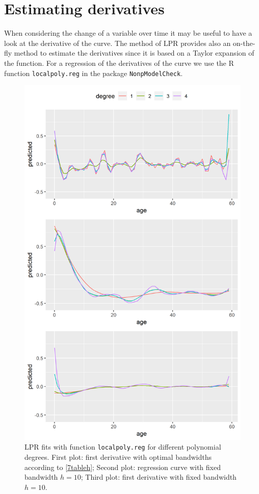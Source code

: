 \section{Estimating derivatives}
When considering the change of a variable over time it may be useful to have a look at the derivative of the curve. The method of LPR provides also an on-the-fly method to estimate the derivatives since it is based on a Taylor expansion of the function. For a regression of the derivatives of the curve we use the R function \texttt{localpoly.reg} in the package \texttt{NonpModelCheck}. 
\begin{figure}[p]
\centering
\includegraphics[width=\textwidth, height=0.87\textheight, keepaspectratio]{ex9/deriv.png}
\caption{LPR fits with function \texttt{localpoly.reg} for different polynomial degrees. First plot: first derivative with optimal bandwidths according to \ref{7tableh}; Second plot: regression curve with fixed bandwidth $h=10$; Third plot: first derivative with fixed bandwidth $h=10$.}
\label{7deriv}
\end{figure}

